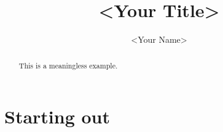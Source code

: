 \documentclass{article}[12pt]
\title{<Your Title>}
\author{<Your Name>}
\begin{document}
\maketitle

\begin{abstract}
This is a meaningless example.
\end{abstract}

\usedsoftware{\Topcat}

\section*{Starting out}




\vfill
\onvott
\cczero
\eject
\end{document}
